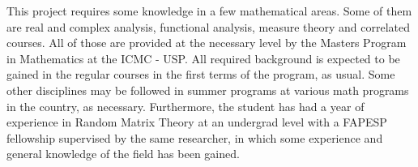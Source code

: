 This project requires some knowledge in a few mathematical areas. Some of them are real and complex analysis, functional analysis, measure theory and correlated courses. All of those are provided at the necessary level by the Masters Program in Mathematics at the ICMC - USP. All required background is expected to be gained in the regular courses in the first terms of the program, as usual. Some other disciplines may be followed in summer programs at various math programs in the country, as necessary. Furthermore, the student has had a year of experience in Random Matrix Theory at an undergrad level with a FAPESP fellowship supervised by the same researcher, in which some experience and general knowledge of the field has been gained.